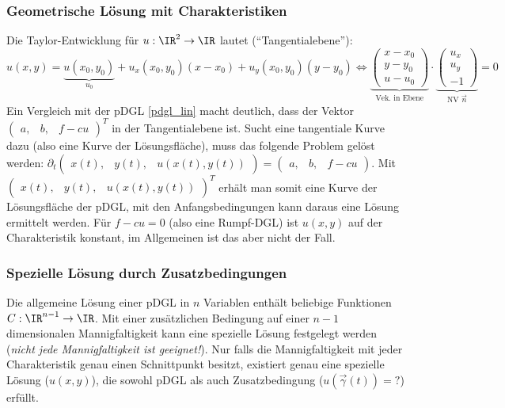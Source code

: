 \subsubsection{Geometrische Lösung mit Charakteristiken}
Die Taylor-Entwicklung für $u:\IR^2\rightarrow \IR$ lautet (\enquote{Tangentialebene}):
\begin{equation}
	u(x,y)=\underbrace{u(x_0,y_0)}_{u_0}+u_x(x_0,y_0)(x-x_0)+u_y(x_0,y_0)(y-y_0) \Leftrightarrow \underbrace{\begin{pmatrix}
		x-x_0\\y-y_0\\u-u_0\end{pmatrix}}_\text{Vek. in Ebene}\cdot\underbrace{\begin{pmatrix}
		u_x\\u_y\\-1\end{pmatrix}}_\text{NV $\vec{n}$}=0
\end{equation}
Ein Vergleich mit der pDGL \ref{pdgl_lin} macht deutlich, dass der Vektor $\begin{pmatrix}
	a,&b,&f-cu\end{pmatrix}^T$ in der Tangentialebene ist. Sucht eine tangentiale Kurve dazu (also eine Kurve der Lösungsfläche), muss das folgende Problem gelöst werden: $\partial_t \begin{pmatrix}
	x(t),&y(t),&u(x(t),y(t))
	\end{pmatrix}=\begin{pmatrix}
	a,&b,&f-cu\end{pmatrix}$.  Mit $\begin{pmatrix}
	x(t),&y(t),&u(x(t),y(t))
	\end{pmatrix}^T$ erhält man somit eine Kurve der Lösungsfläche der pDGL, mit den Anfangsbedingungen kann daraus eine Lösung ermittelt werden. Für $f-cu=0$ (also eine Rumpf-DGL) ist $u(x,y)$ auf der Charakteristik konstant, im Allgemeinen ist das aber nicht der Fall.
	\subsubsection{Spezielle Lösung durch Zusatzbedingungen}
	Die allgemeine Lösung einer pDGL in $n$ Variablen enthält beliebige Funktionen $C:\IR^{n-1}\to\IR$. Mit einer zusätzlichen Bedingung auf einer $n-1$ dimensionalen Mannigfaltigkeit kann eine spezielle Lösung festgelegt werden (\textit{nicht jede Mannigfaltigkeit ist geeignet!}). Nur falls die Mannigfaltigkeit mit jeder Charakteristik genau einen Schnittpunkt besitzt, existiert genau eine spezielle Lösung ($u(x,y)$), die sowohl pDGL als auch Zusatzbedingung ($u\left(\vec{\gamma}(t)\right)=?$) erfüllt.
